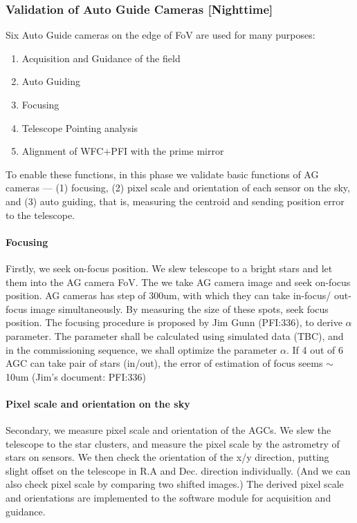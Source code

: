 \subsubsection{Validation of Auto Guide Cameras [Nighttime]}\label{secflow:AGCfunc}


Six Auto Guide cameras on the edge of FoV are used for many purposes:
\begin{enumerate}
\item Acquisition and Guidance of the field 
\item Auto Guiding
\item Focusing
\item Telescope Pointing analysis
\item Alignment of WFC$+$PFI with the prime mirror
\end{enumerate}

To enable these functions, in this phase we validate basic functions of AG cameras --- (1) focusing, (2) pixel scale and orientation of each sensor on the sky, and (3) auto guiding, that is, measuring the centroid and sending position error to the telescope.

\paragraph{Focusing}
Firstly, we seek on-focus position.
We slew telescope to a bright stars and let them into the AG camera FoV.
The we take AG camera image and seek on-focus position.
AG cameras has step of 300um, with which they can take in-focus/ out-focus image simultaneously. 
By measuring the size of these spots, seek focus position.
The focusing procedure is proposed by Jim Gunn (PFI:336), to derive $\alpha$ parameter.
The parameter shall be calculated using simulated data (TBC), and in the commissioning sequence, we shall optimize the parameter $\alpha$.
If 4 out of 6 AGC can take pair of stars (in/out), the error of estimation of focus seems $\sim$10um (Jim's document: PFI:336)

\paragraph{Pixel scale and orientation on the sky}
Secondary, we measure pixel scale and orientation of the AGCs.
We slew the telescope to the star clusters, and measure the pixel scale by the astrometry of stars on sensors.
We then check the orientation of the x/y direction, putting slight offset on the telescope in R.A and Dec. direction individually.
(And we can also check pixel scale by comparing two shifted images.)
The derived pixel scale and orientations are implemented to the software module for acquisition and guidance.

